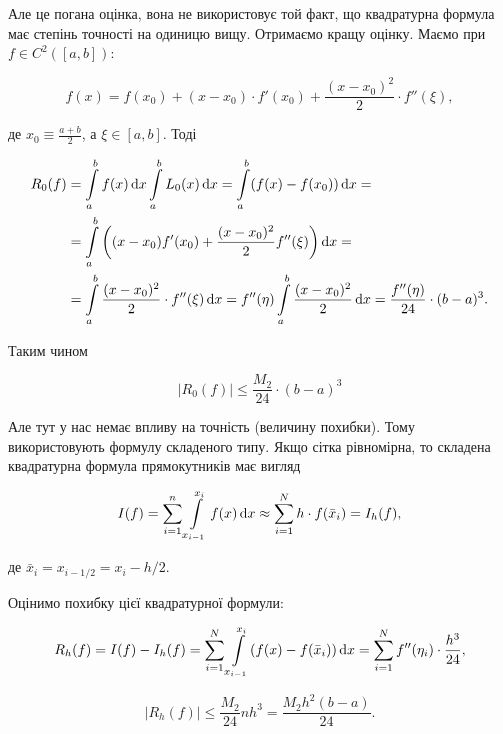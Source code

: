 Але це погана оцінка, вона не використовує той факт, що квадратурна формула має степінь точності на одиницю вищу. Отримаємо кращу оцінку. Маємо при $f \in C^2([a,b])$:

\begin{equation}
	f(x) = f(x_0) + (x - x_0) \cdot f'(x_0) + \frac{(x - x_0)^2}{2} \cdot f''(\xi),
\end{equation}

де $x_0 \equiv \frac{a + b}{2}$, а $\xi \in [a, b]$. Тоді

\begin{equation}
	\begin{aligned}
		R_0(f) &= \displaystyle\int\limits_a^b f(x) \mathop{}\!\mathrm{d} x  \displaystyle\int\limits_a^b L_0(x) \mathop{}\!\mathrm{d} x = \displaystyle\int\limits_a^b (f(x) - f(x_0)) \mathop{}\!\mathrm{d} x = \\
		&= \displaystyle\int\limits_a^b \left((x - x_0) f'(x_0) + \frac{(x - x_0)^2}{2} f''(\xi)\right) \mathop{}\!\mathrm{d} x = \\
		&= \displaystyle\int\limits_a^b \frac{(x - x_0)^2}{2} \cdot f''(\xi) \mathop{}\!\mathrm{d} x = f''(\eta) \displaystyle\int\limits_a^b \frac{(x - x_0)^2}{2} \mathop{}\!\mathrm{d} x = \frac{f''(\eta)}{24} \cdot (b - a)^3.
	\end{aligned}
\end{equation}

Таким чином

\begin{equation}
	|R_0(f)| \le \frac{M_2}{24} \cdot (b - a)^3
\end{equation}

Але тут у нас немає впливу на точність (величину похибки). Тому використовують формулу складеного типу. Якщо сітка рівномірна, то складена квадратурна формула прямокутників має вигляд

\begin{equation}
	I(f) = \displaystyle\sum\limits_{i = 1}^n \displaystyle\int\limits_{x_{i - 1}}^{x_i} f(x) \mathop{}\!\mathrm{d} x \approx \displaystyle\sum\limits_{i = 1}^N h \cdot f ( \bar x_i) = I_h(f),
\end{equation}

де $\bar x_i = x_{i - 1/2} = x_i - h/2$. \medskip

Оцінимо похибку цієї квадратурної формули:

\begin{equation}
	R_h(f) = I(f) - I_h(f) = \displaystyle\sum\limits_{i = 1}^N \displaystyle\int\limits_{x_{i - 1}}^{x_i} (f(x) - f(\bar x_i)) \mathop{}\!\mathrm{d} x = \displaystyle\sum\limits_{i = 1}^N f''(\eta_i) \cdot \frac{h^3}{24},
\end{equation}

\begin{equation}
	|R_h(f)| \le \frac{M_2}{24} n h^3 = \frac{M_2 h^2 (b - a)}{24}.
\end{equation}

